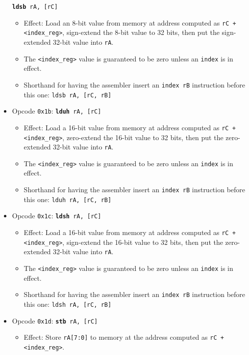 \documentclass{article}
\begin{document}
\begin{itemize}
			\texttt{\textbf{ldsb} rA, [rC]}
		\begin{itemize}
			\item Effect: Load an 8-bit value from memory at address
			computed as \texttt{rC + <index\_reg>}, sign-extend
			the 8-bit value to 32 bits, then put the sign-extended 32-bit
			value into \texttt{rA}.
			\item The \texttt{<index\_reg>} value is guaranteed to be zero
			unless an \texttt{index} is in effect.
			\item Shorthand for having the assembler insert an
			\texttt{index rB} instruction before this one:
				\texttt{ldsb rA, [rC, rB]}
		\end{itemize}
		\item Opcode \texttt{0x1b}:
			\texttt{\textbf{lduh} rA, [rC]}
		\begin{itemize}
			\item Effect: Load a 16-bit value from memory at address
			computed as \texttt{rC + <index\_reg>}, zero-extend
			the 16-bit value to 32 bits, then put the zero-extended 32-bit
			value into \texttt{rA}.
			\item The \texttt{<index\_reg>} value is guaranteed to be zero
			unless an \texttt{index} is in effect.
			\item Shorthand for having the assembler insert an
			\texttt{index rB} instruction before this one:
				\texttt{lduh rA, [rC, rB]}
		\end{itemize}
		\item Opcode \texttt{0x1c}:
			\texttt{\textbf{ldsh} rA, [rC]}
		\begin{itemize}
			\item Effect: Load a 16-bit value from memory at address
			computed as \texttt{rC + <index\_reg>}, sign-extend
			the 16-bit value to 32 bits, then put the zero-extended 32-bit
			value into \texttt{rA}.
			\item The \texttt{<index\_reg>} value is guaranteed to be zero
			unless an \texttt{index} is in effect.
			\item Shorthand for having the assembler insert an
			\texttt{index rB} instruction before this one:
				\texttt{ldsh rA, [rC, rB]}
		\end{itemize}
		\item Opcode \texttt{0x1d}:
			\texttt{\textbf{stb} rA, [rC]}
		\begin{itemize}
			\item Effect: Store \texttt{rA[7:0]} to memory at the address
			computed as \texttt{rC + <index\_reg>}.

\end{itemize}
\end{itemize}
\end{document}
